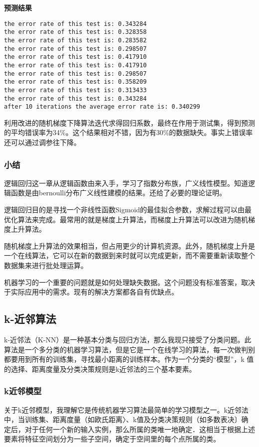 \noindent\textbf{预测结果}\par
\begin{lstlisting}
the error rate of this test is: 0.343284
the error rate of this test is: 0.328358
the error rate of this test is: 0.283582
the error rate of this test is: 0.298507
the error rate of this test is: 0.417910
the error rate of this test is: 0.417910
the error rate of this test is: 0.298507
the error rate of this test is: 0.358209
the error rate of this test is: 0.313433
the error rate of this test is: 0.343284
after 10 iterations the average error rate is: 0.340299
\end{lstlisting}

利用改进的随机梯度下降算法迭代求得回归系数，最终在作用于测试集，得到预测的平均错误率为34\%。这个结果相对不错，因为有30\%的数据缺失。事实上错误率还可以通过调参往下降。

\subsubsection{小结}
逻辑回归这一章从逻辑函数由来入手，学习了指数分布族，广义线性模型。知道逻辑函数是由bernoulli分布广义线性建模的结果。还给了必要的理论证明。

逻辑回归目的是寻找一个非线性函数Sigmoid的最佳拟合参数，求解过程可以由最优化算法来完成。最常用的就是梯度上升算法，而梯度上升算法可以改进为随机梯度上升算法。

随机梯度上升算法的效果相当，但占用更少的计算机资源。此外，随机梯度上升是一个在线算法，它可以在新的数据到来时就可以完成更新，而不需要重新读取整个数据集来进行批处理运算。

机器学习的一个重要的问题就是如何处理缺失数据。这个问题没有标准答案，取决于实际应用中的需求。现有的解决方案都各自有优缺点。

\newpage


\subsection{k-近邻算法}
k-近邻法（K-NN）是一种基本分类与回归方法，那么我现只接受了分类问题。此算法是一个多分类的机器学习算法，但是它是一个在线学习的算法，每一次做判别都要用到所有的训练集，寻找最小距离的训练样本。作为一个分类的“模型”，k 值的选择、距离度量及分类决策规则是k近邻法的三个基本要素。
\subsubsection{k近邻模型}
关于k近邻模型，我理解它是传统机器学习算法最简单的学习模型之一。k近邻法中，当训练集、距离度量（如欧氏距离〉、k值及分类决策规则（如多数表决〕确定后，对于任何一个新的输入实例，那么所属的类唯一地确定．这相当于根据上述要素将特征空间划分为一些子空间，确定于空间里的每个点所属的类。

